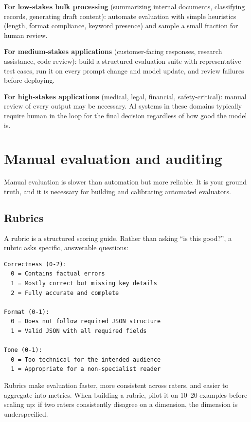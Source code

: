 \textbf{For low-stakes bulk processing} (summarizing internal documents, classifying records, generating draft content): automate evaluation with simple heuristics (length, format compliance, keyword presence) and sample a small fraction for human review.

\textbf{For medium-stakes applications} (customer-facing responses, research assistance, code review): build a structured evaluation suite with representative test cases, run it on every prompt change and model update, and review failures before deploying.

\textbf{For high-stakes applications} (medical, legal, financial, safety-critical): manual review of every output may be necessary. AI systems in these domains typically require human in the loop for the final decision regardless of how good the model is.


\section{Manual evaluation and auditing}

Manual evaluation is slower than automation but more reliable. It is your ground truth, and it is necessary for building and calibrating automated evaluators.

\subsection{Rubrics}

A rubric is a structured scoring guide. Rather than asking ``is this good?'', a rubric asks specific, answerable questions:

\begin{verbatim}
Correctness (0-2):
  0 = Contains factual errors
  1 = Mostly correct but missing key details
  2 = Fully accurate and complete

Format (0-1):
  0 = Does not follow required JSON structure
  1 = Valid JSON with all required fields

Tone (0-1):
  0 = Too technical for the intended audience
  1 = Appropriate for a non-specialist reader
\end{verbatim}

Rubrics make evaluation faster, more consistent across raters, and easier to aggregate into metrics. When building a rubric, pilot it on 10--20 examples before scaling up: if two raters consistently disagree on a dimension, the dimension is underspecified.

